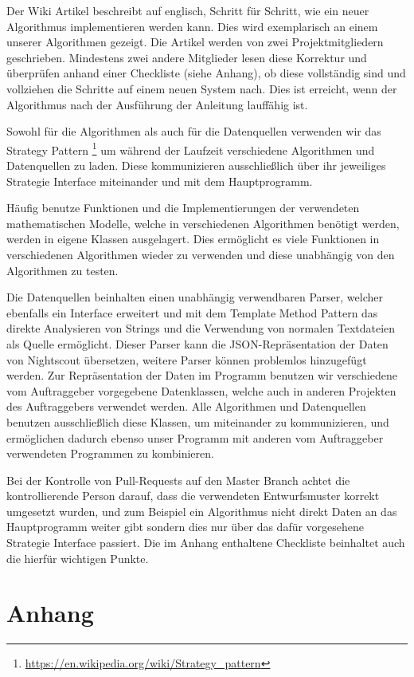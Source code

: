 \documentclass[accentcolor=tud0b,12pt,paper=a4]{tudreport}
\begin{document}
Der Wiki Artikel beschreibt auf englisch, Schritt für Schritt, wie ein neuer Algorithmus implementieren werden kann. Dies wird exemplarisch an einem unserer Algorithmen gezeigt. Die Artikel werden von zwei Projektmitgliedern geschrieben. Mindestens zwei andere Mitglieder lesen diese Korrektur und überprüfen anhand einer Checkliste (siehe Anhang), ob diese vollständig sind und vollziehen die Schritte auf einem neuen System nach. Dies ist erreicht, wenn der Algorithmus nach der Ausführung der Anleitung lauffähig ist.

Sowohl für die Algorithmen als auch für die Datenquellen verwenden wir das Strategy Pattern \footnote{\url{https://en.wikipedia.org/wiki/Strategy_pattern}} um während der Laufzeit verschiedene Algorithmen und Datenquellen zu laden. Diese kommunizieren ausschließlich über ihr jeweiliges Strategie Interface miteinander und mit dem Hauptprogramm.

Häufig benutze Funktionen und die Implementierungen der verwendeten mathematischen Modelle, welche in verschiedenen Algorithmen benötigt werden, werden in eigene Klassen ausgelagert. Dies ermöglicht es viele Funktionen in verschiedenen Algorithmen wieder zu verwenden und diese unabhängig von den Algorithmen zu testen.

Die Datenquellen beinhalten einen unabhängig verwendbaren Parser, welcher ebenfalls ein Interface erweitert und mit dem Template Method Pattern das direkte Analysieren von Strings und die Verwendung von normalen Textdateien als Quelle ermöglicht. Dieser Parser kann die JSON-Repräsentation der Daten von Nightscout übersetzen, weitere Parser können problemlos hinzugefügt werden. Zur Repräsentation der Daten im Programm benutzen wir verschiedene vom Auftraggeber vorgegebene Datenklassen, welche auch in anderen Projekten des Auftraggebers verwendet werden. Alle Algorithmen und Datenquellen benutzen ausschließlich diese Klassen, um miteinander zu kommunizieren, und ermöglichen dadurch ebenso unser Programm mit anderen vom Auftraggeber verwendeten Programmen zu kombinieren.

Bei der Kontrolle von Pull-Requests auf den Master Branch achtet die kontrollierende Person darauf, dass die verwendeten Entwurfsmuster korrekt umgesetzt wurden, und zum Beispiel ein Algorithmus nicht direkt Daten an das Hauptprogramm weiter gibt sondern dies nur über das dafür vorgesehene Strategie Interface passiert. Die im Anhang enthaltene Checkliste beinhaltet auch die hierfür wichtigen Punkte.
	        
	
\appendix	
	\chapter{Anhang}
		
\end{document}
